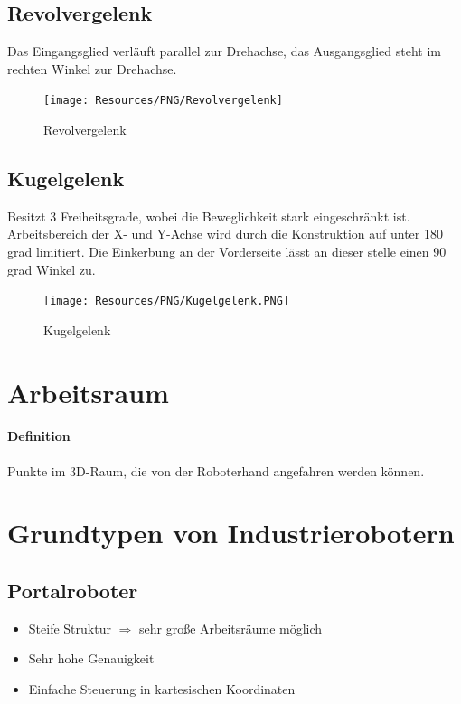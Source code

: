 \subsection{Revolvergelenk}
Das Eingangsglied verläuft parallel zur Drehachse, das Ausgangsglied steht im rechten Winkel zur Drehachse.
\begin{figure}[H]
	\begin{center}
		\texttt{[image: Resources/PNG/Revolvergelenk]}
		\caption{Revolvergelenk}
		\label{fig:Resources/PNG/Revolvergelenk}
	\end{center}
\end{figure}
\subsection{Kugelgelenk}
Besitzt 3 Freiheitsgrade, wobei die Beweglichkeit stark eingeschränkt ist.
Arbeitsbereich der X- und Y-Achse wird durch die Konstruktion auf unter
180 grad limitiert.
Die Einkerbung an der Vorderseite lässt an dieser stelle einen 90 grad Winkel zu.
\begin{figure}[H]
	\begin{center}
		\texttt{[image: Resources/PNG/Kugelgelenk.PNG]}
		\caption{Kugelgelenk}
		\label{fig:Resources/PNG/Kugelgelenk.PNG}
	\end{center}
\end{figure}
\section{Arbeitsraum}
\paragraph{Definition} Punkte im 3D-Raum, die von der Roboterhand angefahren werden können.
\section{Grundtypen von Industrierobotern}
\subsection{Portalroboter}
\begin{itemize}
	\item Steife Struktur $\Rightarrow$ sehr große Arbeitsräume möglich
	\item Sehr hohe Genauigkeit
	\item Einfache Steuerung in kartesischen Koordinaten
\end{itemize}
